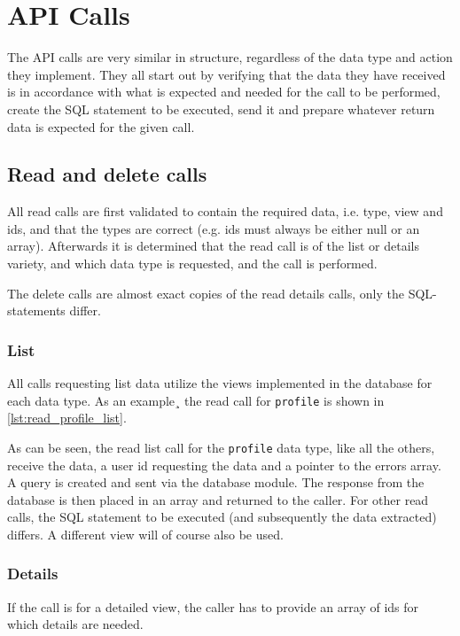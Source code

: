 \section{API Calls}
The API calls are very similar in structure, regardless of the data type and action they implement. They all start out by verifying that the data they have received is in accordance with what is expected and needed for the call to be performed, create the SQL statement to be executed, send it and prepare whatever return data is expected for the given call. 

\subsection{Read and delete calls}
All read calls are first validated to contain the required data, i.e. type, view and ids, and that the types are correct (e.g. ids must always be either null or an array). Afterwards it is determined that the read call is of the list or details variety, and which data type is requested, and the call is performed.

The delete calls are almost exact copies of the read details calls, only the SQL-statements differ.

\subsubsection{List}
All calls requesting list data utilize the views implemented in the database for each data type. As an example¸ the read call for \lstinline|profile| is shown in \autoref{lst:read_profile_list}.



As can be seen, the read list call for the \lstinline|profile| data type, like all the others, receive the data, a user id requesting the data and a pointer to the errors array. A query is created and sent via the database module. The response from the database is then placed in an array and returned to the caller. For other read calls, the SQL statement to be executed (and subsequently the data extracted) differs. A different view will of course also be used.

\subsubsection{Details}
If the call is for a detailed view, the caller has to provide an array of ids for which details are needed. 

